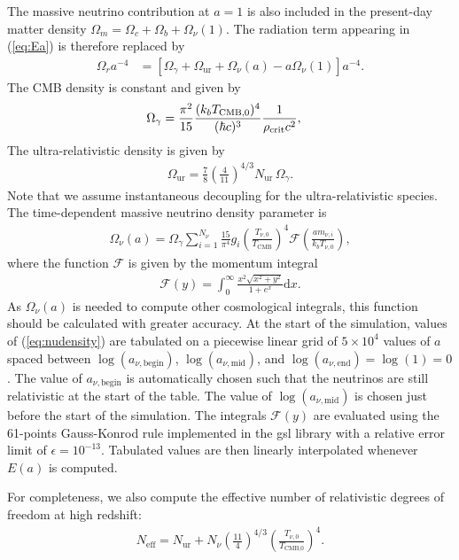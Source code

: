The massive neutrino contribution at $a=1$ is also included in the present-day matter density $\Omega_m=\Omega_c+\Omega_b+\Omega_{\nu}(1)$. The radiation term appearing in (\ref{eq:Ea}) is therefore replaced by
\begin{align}
    \Omega_r a^{-4} &= \left[\Omega_\gamma + \Omega_\mathrm{ur} + \Omega_\nu(a) - a\Omega_{\nu}(1)\right] a^{-4}.
\end{align}
The CMB density is constant and given by
%
\begin{align}
    \Omega_\gamma &= \frac{\pi^2}{15}\frac{(k_b T_\text{CMB,0})^4}{(\hbar c)^3}\frac{1}{\rho_{\rm crit}c^2},
\end{align}
The ultra-relativistic density is given by
\begin{align}
    \Omega_\mathrm{ur} = \frac{7}{8}\left(\frac{4}{11}\right)^{4/3} N_\mathrm{ur}\,\Omega_\gamma.
\end{align}
Note that we assume instantaneous decoupling for the ultra-relativistic species. The time-dependent massive neutrino density parameter is \citep{Zennaro2016}
\begin{align}
    \Omega_\nu(a) = \Omega_\gamma \sum_{i=1}^{N_\nu}\frac{15}{\pi^4}g_i\left(\frac{T_{\nu,0}}{T_\text{CMB}}\right)^4 \mathcal{F}\left(\frac{a m_{\nu,i}}{k_b T_{\nu,0}}\right), \label{eq:nudensity}
\end{align}
where the function $\mathcal{F}$ is given by the momentum integral
%
\begin{align}
    \mathcal{F}(y) = \int_0^{\infty} \frac{x^2\sqrt{x^2+y^2}}{1+e^{x}}\mathrm{d}x.
\end{align}
As $\Omega_\nu(a)$ is needed to compute other cosmological integrals, this function should be calculated with greater accuracy. At the start of the simulation, values of (\ref{eq:nudensity}) are tabulated on a piecewise linear grid of $5\times10^4$ values of $a$ spaced between $\log(a_{\nu,\text{begin}})$, $\log(a_{\nu,\text{mid}})$, and $\log(a_{\nu,\text{end}}) = \log(1)=0$. The value of $a_{\nu,\text{begin}}$ is automatically chosen such that the neutrinos are still relativistic at the start of the table. The value of $\log(a_{\nu,\text{mid}})$ is chosen just before the start of the simulation. The integrals $\mathcal{F}(y)$ are evaluated using the 61-points Gauss-Konrod rule implemented in the {\sc gsl} library with a relative error limit of $\epsilon=10^{-13}$. Tabulated values are then linearly interpolated whenever $E(a)$ is computed.

For completeness, we also compute the effective number of relativistic degrees of freedom at high redshift:
\begin{align}
    N_\text{eff} = N_\mathrm{ur} + N_\nu\left(\frac{11}{4}\right)^{4/3}\left(\frac{T_{\nu,0}}{T_\text{CMB,0}}\right)^4.
\end{align}
